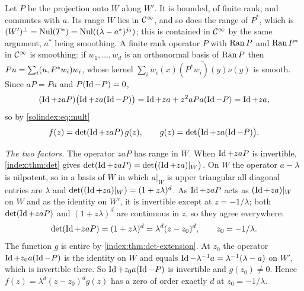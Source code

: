 Let $P$ be the projection onto $W$ along $W'$. It is bounded, of finite rank, and
commutes with $a$. Its range $W$ lies in $\mathcal{C}^\infty$, and so does the range of $P^*$, which
is $(W')^\perp=\operatorname{Nul}(T^*)=\operatorname{Nul}((\bar\lambda-a^*)^{j_0})$; this is contained in $\mathcal{C}^\infty$
by the same argument, $a^*$ being smoothing. A finite rank operator $P$ with
$\operatorname{Ran} P$ and $\operatorname{Ran} P^*$ in $\mathcal{C}^\infty$ is smoothing: if $w_1,\dots,w_d$ is an orthonormal
basis of $\operatorname{Ran} P$ then $Pu=\sum_i( u, P^*w_i)w_i$, whose kernel
$\sum_iw_i(x)\overline{(P^*w_i)(y)}\nu(y)$ is smooth. Since $aP=Pa$ and
$P(\operatorname{Id}-P)=0$,
\begin{equation*}
  (\operatorname{Id}+zaP)\bigl(\operatorname{Id}+za(\operatorname{Id}-P)\bigr)=\operatorname{Id}+za+z^2aPa(\operatorname{Id}-P)=\operatorname{Id}+za ,
\end{equation*}
so by \eqref{solindex:eq:mult}
\begin{equation*}
  f(z)=\det(\operatorname{Id}+zaP)\,g(z),\qquad g(z)=\det\bigl(\operatorname{Id}+za(\operatorname{Id}-P)\bigr).
\end{equation*}

\emph{The two factors.} The operator $zaP$ has range in $W$. When $\operatorname{Id}+zaP$ is
invertible, \cref{index:thm:det} gives $\det(\operatorname{Id}+zaP)=\det\bigl((\operatorname{Id}+za)|_W\bigr)$.
On $W$ the operator $a-\lambda$ is nilpotent, so in a basis of $W$ in which $a|_W$ is
upper triangular all diagonal entries are $\lambda$ and
$\det((\operatorname{Id}+za)|_W)=(1+z\lambda)^d$. As $\operatorname{Id}+zaP$ acts as $(\operatorname{Id}+za)|_W$ on $W$ and as
the identity on $W'$, it is invertible except at $z=-1/\lambda$; both
$\det(\operatorname{Id}+zaP)$ and $(1+z\lambda)^d$ are continuous in $z$, so they agree everywhere:
\begin{equation*}
  \det(\operatorname{Id}+zaP)=(1+z\lambda)^d=\lambda^d(z-z_0)^d,\qquad z_0=-1/\lambda .
\end{equation*}
The function $g$ is entire by \cref{index:thm:det-extension}. At $z_0$ the operator
$\operatorname{Id}+z_0a(\operatorname{Id}-P)$ is the identity on $W$ and equals $\operatorname{Id}-\lambda^{-1}a=\lambda^{-1}(\lambda-a)$
on $W'$, which is invertible there. So $\operatorname{Id}+z_0a(\operatorname{Id}-P)$ is invertible and
$g(z_0)\ne0$. Hence $f(z)=\lambda^d(z-z_0)^dg(z)$ has a zero of order exactly $d$ at
$z_0=-1/\lambda$.

